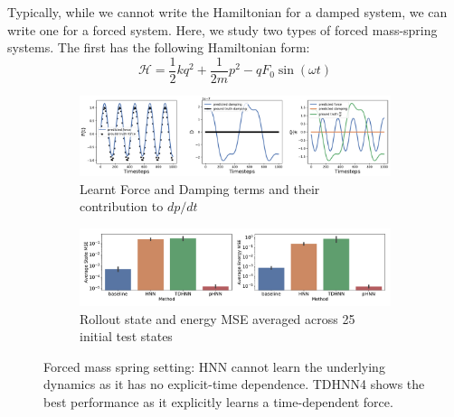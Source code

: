 \documentclass[twoside]{article}
\begin{document}
Typically, while we cannot write the Hamiltonian for a damped system, we can write one for a forced system. Here, we study two types of forced mass-spring systems. The first has the following Hamiltonian form:
\begin{equation}
\mathcal{H} = \frac{1}{2}kq^2 + \frac{1}{2m}p^2 - qF_0\sin(\omega t) 
\end{equation}
\begin{figure}[h!]
\centering
\captionsetup{justification=centering}
	\begin{subfigure}[b]{0.48\textwidth}
		\centering
		\includegraphics[width=\textwidth]{figures/figures/forced_mass_spring/1/forced_mass_spring_dpdt_0.pdf}
		\caption{Learnt Force and Damping terms and their contribution to $dp/dt$}
	\end{subfigure}
	\begin{subfigure}[b]{0.48\textwidth}
	    \centering
		\includegraphics[width=\textwidth]{figures/figures/forced_mass_spring/1/forced_mass_spring_errors_0.pdf}
		\caption{Rollout state and energy MSE averaged across 25 initial test states}
	\end{subfigure}
\caption{Forced mass spring setting: HNN cannot learn the underlying dynamics as it has no explicit-time dependence. TDHNN4 shows the best performance as it explicitly learns a time-dependent force.}
\label{fig.fmspring1}
\end{figure}
\end{document}
